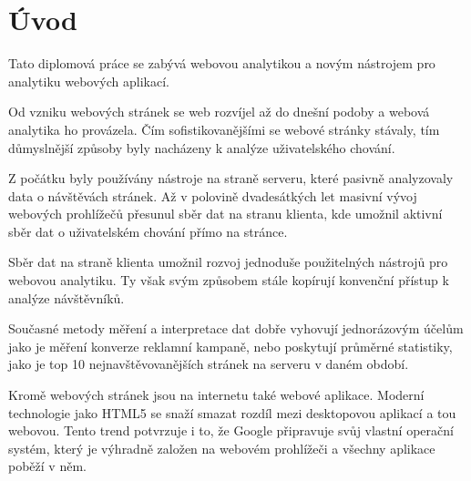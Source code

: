 \documentclass[bc,female,java,dept456]{diploma}						%
\begin{document}
\MakeTitlePages

\tableofcontents
\cleardoublepage	%


\listoffigures
\cleardoublepage	%


\lstlistoflistings
\cleardoublepage	%










\section{Úvod}
\label{sec:Uvod}


Tato diplomová práce se zabývá webovou analytikou a novým nástrojem pro analytiku webových aplikací. 

Od vzniku webových stránek se web rozvíjel až do dnešní podoby a webová analytika ho provázela. Čím sofistikovanějšími se webové stránky stávaly, tím důmyslnější způsoby byly nacházeny k analýze uživatelského chování.

Z počátku byly používány nástroje na straně serveru, které pasivně analyzovaly data o návštěvách stránek. Až v polovině dvadesátkých let masivní vývoj webových prohlížečů přesunul sběr dat na stranu klienta, kde umožnil aktivní sběr dat o uživatelském chování přímo na stránce.

Sběr dat na straně klienta umožnil rozvoj jednoduše použitelných nástrojů pro webovou analytiku. Ty však svým způsobem stále kopírují konvenční přístup k analýze návštěvníků.

Současné metody měření a interpretace dat dobře vyhovují jednorázovým účelům jako je měření konverze reklamní kampaně, nebo poskytují průměrné statistiky, jako je top 10 nejnavštěvovanějších stránek na serveru v daném období.

Kromě webových stránek jsou na internetu také webové aplikace. Moderní technologie jako HTML5 se snaží smazat rozdíl mezi desktopovou aplikací a tou webovou. Tento trend potvrzuje i to, že Google připravuje svůj vlastní operační systém, který je výhradně založen na webovém prohlížeči a všechny aplikace poběží v něm.
\end{document}

